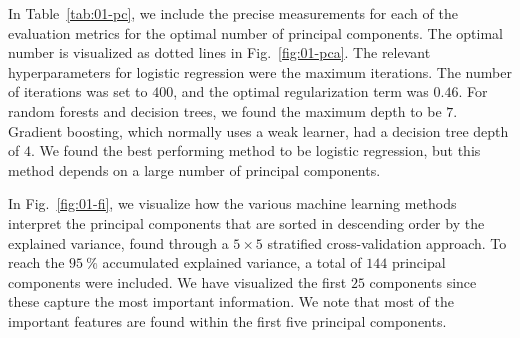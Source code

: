 \documentclass[superscriptaddress,unsortedaddress,
 amsmath,amssymb,
 aps,
]{revtex4-2}
\begin{document}
\begin{table}[b]
\centering
\caption{Optimal number of principal components and the respective scores (standard deviation) for each of the four ML methods logistic regression (LOG), decision trees (DT), random forests (RF) and gradient boosting (GB) in the Ferrenti approach, as visualized by the dash-dotted line in Fig.~\ref{fig:01-pca}.}
\label{tab:01-pc}
\noindent{}
\end{table}

In Table~\ref{tab:01-pc}, we include the precise measurements for each of the evaluation metrics for the optimal number of principal components. The optimal number is visualized as dotted lines in Fig.~\ref{fig:01-pca}. The relevant hyperparameters for logistic regression were the maximum iterations. The number of iterations was set to $400$, and the optimal regularization term was $0.46$. For random forests and decision trees, we found the maximum depth to be $7$. Gradient boosting, which normally uses a weak learner, had a decision tree depth of $4$. We found the best performing method to be logistic regression, but this method depends on a large number of principal components. 

In Fig.~\ref{fig:01-fi}, we visualize how the various machine learning methods  interpret the principal components that are sorted in descending order by the explained variance, found through a $5\times 5$ stratified cross-validation approach. To reach the $95 \ \%$ accumulated explained variance, a total of $144$ principal components were included. We have visualized the first $25$ components since these capture the most important information. We note that most of the important features are found within the first five principal components.
\end{document}
